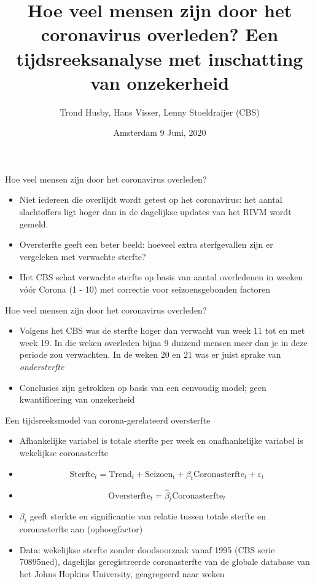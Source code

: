 \documentclass[final, 12pt, aspectratio=169, xcolor={dvipsnames}]{beamer}
\title[PEARL]{Hoe veel mensen zijn door het coronavirus overleden? Een tijdsreeksanalyse met inschatting van onzekerheid}
\subtitle[PEARL]{}
\author[T. Husby]{Trond Husby, Hans Visser, Lenny Stoeldraijer (CBS) }
\institute[PBL]{
  Netherlands Environmental Assesment Agency (PBL) \\[5ex]
  \texttt{trond.husby@pbl.nl}
}
\date[\today]{Amsterdam 9 Juni, 2020}
\begin{document}
\beamertemplatenavigationsymbolsempty

{

  \begin{frame}
    \titlepage
  \end{frame}
}

\begin{frame}{Hoe veel mensen zijn door het coronavirus overleden?}
  \begin{itemize}
  \item Niet iedereen die overlijdt wordt getest op het coronavirus: het aantal slachtoffers ligt hoger dan in de dagelijkse updates van het RIVM wordt gemeld.
  \item Oversterfte geeft een beter beeld: hoeveel extra sterfgevallen zijn er vergeleken met verwachte sterfte?
  \item Het CBS schat verwachte sterfte op basis van aantal overledenen in weeken vóór Corona (1 - 10) met correctie voor seizoensgebonden factoren
    \end{itemize}
\end{frame}

\begin{frame}{Hoe veel mensen zijn door het coronavirus overleden?}
  \begin{itemize}
  \item Volgens het CBS was de sterfte hoger dan verwacht van week 11 tot en met week 19. In die weken overleden bijna 9 duizend mensen meer dan je in deze periode zou verwachten. In de weken 20 en 21 was er juist sprake van \textit{ondersterfte}
  \item Conclusies zijn getrokken op basis van een eenvoudig model; geen kwantificering van onzekerheid
    \end{itemize}
\end{frame}


\begin{frame}{Een tijdsreeksmodel van corona-gerelateerd oversterfte}
  \begin{itemize}
    \item Afhankelijke variabel is totale sterfte per week en onafhankelijke variabel is wekelijkse coronasterfte
    \item[] $$ \text{Sterfte}_{t} = \text{Trend}_{t} + \text{Seizoen}_{t} + \beta_{t} \text{Coronasterfte}_{t} + \varepsilon_{t} $$
    \item[]  $$\text{Oversterfte}_{t} = \hat{\beta}_{t} \text{Coronasterfte}_{t}$$
    \item $\beta_{t}$ geeft sterkte en significantie van relatie tussen totale sterfte en coronasterfte aan (ophoogfactor)
      \item Data: wekelijkse sterfte zonder doodsoorzaak vanaf 1995 (CBS serie 70895ned), dagelijks geregistreerde coronasterfte van de globale database van het Johns Hopkins University, geagregeerd naar weken
    \end{itemize}
\end{frame}
\end{document}
